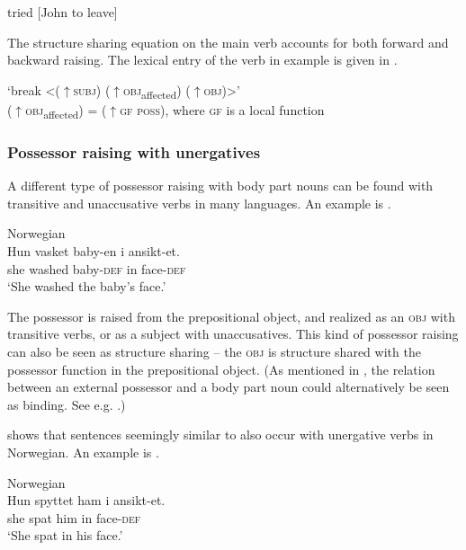 \documentclass[output=paper,hidelinks]{langscibook}
\begin{document}
 \ea\label{ex:Scandinavian:76}
 tried [John to leave]
\z

\noindent The structure sharing equation on the main verb accounts for both forward and backward raising. The lexical entry of the verb in example  is given in .



\ea\label{ex:Scandinavian:77}
`break <(${\uparrow}$\textsc{subj}) (${\uparrow}$\textsc{obj}\textsubscript{affected}) (${\uparrow}$\textsc{obj})>'\\
(${\uparrow}$\textsc{obj}\textsubscript{affected}) = (${\uparrow}$\textsc{gf} \textsc{poss}), where \textsc{gf} is a local function
\z

\subsubsection{Possessor raising with unergatives}

A different type of possessor raising with body part nouns can be found with transitive and unaccusative verbs in many languages. An example is .


\newpage
\ea\label{ex:Scandinavian:78} Norwegian \citep[562]{Lodrup19b}\\
\gll
 {Hun} {vasket} {baby-en} {i} {ansikt-et.}\\
 she washed baby-\textsc{def} in face-\textsc{def}\\
\glt `She washed the baby's face.'\z

\noindent The possessor is raised from the prepositional object, and realized as an \textsc{obj} with transitive verbs, or as a subject with unaccusatives. This kind of possessor raising can also be seen as structure sharing -- the \textsc{obj} is structure shared with the possessor function in the prepositional object. (As mentioned in , the relation between an external possessor and a body part noun could alternatively be seen as binding. See e.g. \citealt{Deal17}.)

\citet{Lodrup99,Lodrup19b} shows that sentences seemingly similar to  also occur with unergative verbs in Norwegian. An example is .



\ea\label{ex:Scandinavian:79} Norwegian \citep[563]{Lodrup19b}\\
\gll
 {Hun} {spyttet} {ham} {i} {ansikt-et.}\\
 she spat him in face-\textsc{def}\\
\glt `She spat in his face.' \z
\end{document}

